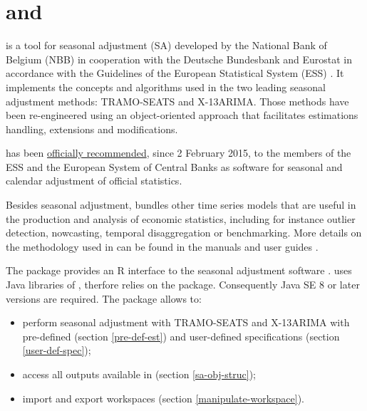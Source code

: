\documentclass[article]{jss}
\providecommand{\tightlist}{%
  \setlength{\itemsep}{0pt}\setlength{\parskip}{0pt}}
\begin{document}
\section[JDemetra+ and RJDemetra]{ and }

 is a tool for seasonal adjustment (SA) developed by
the National Bank of Belgium (NBB) in cooperation with the Deutsche
Bundesbank and Eurostat in accordance with the Guidelines of the
European Statistical System (ESS) \citep{eurostat2015guidelines}. It
implements the concepts and algorithms used in the two leading seasonal
adjustment methods: TRAMO-SEATS and X-13ARIMA. Those methods have been
re-engineered using an object-oriented approach that facilitates
estimations handling, extensions and modifications.

 has been
\href{https://ec.europa.eu/eurostat/cros/system/files/Jdemetra_\%20release.pdf}{officially
recommended}, since 2 February 2015, to the members of the ESS and the
European System of Central Banks as software for seasonal and calendar
adjustment of official statistics.

Besides seasonal adjustment,  bundles other time
series models that are useful in the production and analysis of economic
statistics, including for instance outlier detection, nowcasting,
temporal disaggregation or benchmarking. More details on the methodology
used in  can be found in the 
manuals and user guides
\citep{grudkowska2015jdemetrarm, grudkowska2015jdemetraug}.

The package  \citep{RJDemetra} provides an R interface to
the seasonal adjustment software . 
uses Java libraries of , therfore relies on the
 \citep{rJava} package. Consequently Java SE 8 or later
versions are required. The package allows to:

\begin{itemize}
\tightlist
\item
  perform seasonal adjustment with TRAMO-SEATS and X-13ARIMA with
  pre-defined (section \ref{pre-def-est}) and user-defined
  specifications (section \ref{user-def-spec});\\
\item
  access all outputs available in  (section
  \ref{sa-obj-struc});\\
\item
  import and export  workspaces (section
  \ref{manipulate-workspace}).
\end{itemize}
\end{document}
